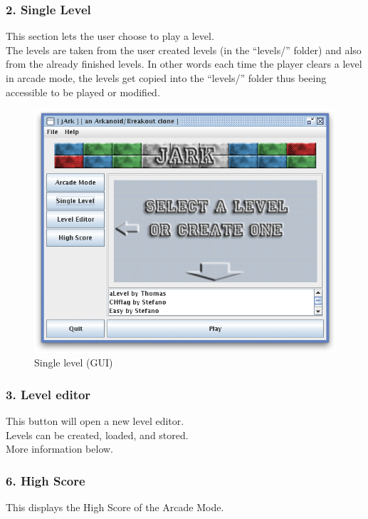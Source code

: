 \documentclass[12pt]{article}
\begin{document}
\subsubsection*{2. Single Level}
This section lets the user choose to play a level.\\
The levels are taken from the user created levels (in the ``levels/'' folder) and also from the already finished levels. In other words each time the player clears a level in arcade mode, the levels get copied into the ``levels/'' folder thus beeing accessible to be played or modified.\\
\begin{figure}[htbp]
  \centering
    \includegraphics[scale=0.6]{singlelevel.png}
  \caption{Single level (GUI)}
  \label{guimain}
\end{figure}

\subsubsection*{3. Level editor}
This button will open a new level editor.\\
Levels can be created, loaded, and stored.\\
More information below.

\subsubsection*{6. High Score}
This displays the High Score of the Arcade Mode.\\
\end{document}
